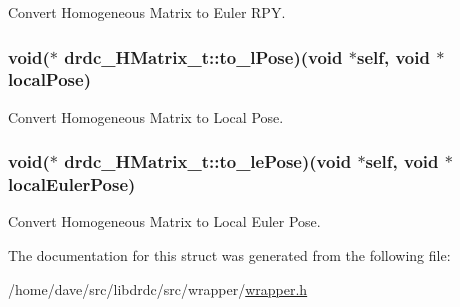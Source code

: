 Convert Homogeneous Matrix to Euler RPY. 

\hypertarget{structdrdc__HMatrix__t_7c6792ab2cdaf09ac6c1d706b0e708c1}{
\subsubsection[to\_\-lPose]{\setlength{\rightskip}{0pt plus 5cm}void($\ast$ {\bf drdc\_\-HMatrix\_\-t::to\_\-lPose})(void $\ast$self, void $\ast$localPose)}}
\label{structdrdc__HMatrix__t_7c6792ab2cdaf09ac6c1d706b0e708c1}


Convert Homogeneous Matrix to Local Pose. 

\hypertarget{structdrdc__HMatrix__t_abb29b23fa2c3c71fbbb6209984ef9af}{
\subsubsection[to\_\-lePose]{\setlength{\rightskip}{0pt plus 5cm}void($\ast$ {\bf drdc\_\-HMatrix\_\-t::to\_\-lePose})(void $\ast$self, void $\ast$localEulerPose)}}
\label{structdrdc__HMatrix__t_abb29b23fa2c3c71fbbb6209984ef9af}


Convert Homogeneous Matrix to Local Euler Pose. 



The documentation for this struct was generated from the following file:\begin{CompactItemize}
\item 
/home/dave/src/libdrdc/src/wrapper/\hyperlink{wrapper_8h}{wrapper.h}\end{CompactItemize}
